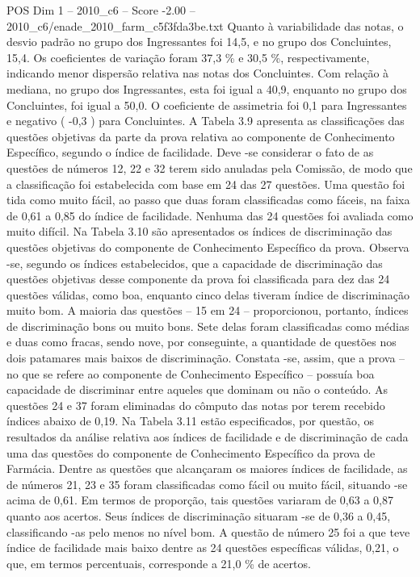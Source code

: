 \begin{textsample}{POS Dim 1 – 2010\_c6 – Score -2.00 – 2010\_c6/enade\_2010\_farm\_c5f3fda3be.txt}
Quanto à variabilidade das notas, o desvio padrão no grupo dos Ingressantes foi 14,5, e no grupo dos Concluintes, 15,4.
Os coeficientes de variação foram 37,3 \% e 30,5 \%, respectivamente, indicando menor dispersão relativa nas notas dos Concluintes.
Com relação à mediana, no grupo dos Ingressantes, esta foi igual a 40,9, enquanto no grupo dos Concluintes, foi igual a 50,0.
O coeficiente de assimetria foi 0,1 para Ingressantes e negativo ( -0,3 ) para Concluintes.
A Tabela 3.9 apresenta as classificações das questões objetivas da parte da prova relativa ao componente de Conhecimento Específico, segundo o índice de facilidade.
Deve -se considerar o fato de as questões de números 12, 22 e 32 terem sido anuladas pela Comissão, de modo que a classificação foi estabelecida com base em 24 das 27 questões.
Uma questão foi tida como muito fácil, ao passo que duas foram classificadas como fáceis, na faixa de 0,61 a 0,85 do índice de facilidade.
Nenhuma das 24 questões foi avaliada como muito difícil.
Na Tabela 3.10 são apresentados os índices de discriminação das questões objetivas do componente de Conhecimento Específico da prova.
Observa -se, segundo os índices estabelecidos, que a capacidade de discriminação das questões objetivas desse componente da prova foi classificada para dez das 24 questões válidas, como boa, enquanto cinco delas tiveram índice de discriminação muito bom.
A maioria das questões – 15 em 24 – proporcionou, portanto, índices de discriminação bons ou muito bons.
Sete delas foram classificadas como médias e duas como fracas, sendo nove, por conseguinte, a quantidade de questões nos dois patamares mais baixos de discriminação.
Constata -se, assim, que a prova – no que se refere ao componente de Conhecimento Específico – possuía boa capacidade de discriminar entre aqueles que dominam ou não o conteúdo.
As questões 24 e 37 foram eliminadas do cômputo das notas por terem recebido índices abaixo de 0,19.
Na Tabela 3.11 estão especificados, por questão, os resultados da análise relativa aos índices de facilidade e de discriminação de cada uma das questões do componente de Conhecimento Específico da prova de Farmácia.
Dentre as questões que alcançaram os maiores índices de facilidade, as de números 21, 23 e 35 foram classificadas como fácil ou muito fácil, situando -se acima de 0,61.
Em termos de proporção, tais questões variaram de 0,63 a 0,87 quanto aos acertos.
Seus índices de discriminação situaram -se de 0,36 a 0,45, classificando -as pelo menos no nível bom.
A questão de número 25 foi a que teve índice de facilidade mais baixo dentre as 24 questões específicas válidas, 0,21, o que, em termos percentuais, corresponde a 21,0 \% de acertos.

\end{textsample}

